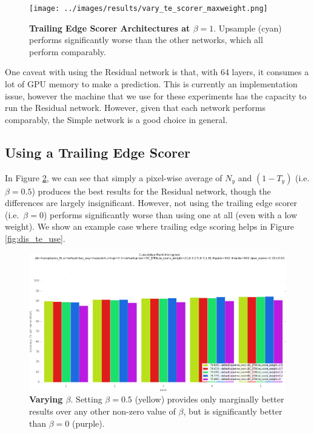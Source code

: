 \begin{figure}[t]%
\centering
\texttt{[image: ../images/results/vary\_te\_scorer\_maxweight.png]}
\caption{\textbf{Trailing Edge Scorer Architectures at $\beta = 1$}. Upsample (cyan) performs significantly worse than the other networks, which all perform comparably.}
\label{fig:vary_te_scorer_maxweight}
\end{figure}

One caveat with using the Residual network is that, with 64 layers, it consumes a lot of GPU memory to make a prediction.
This is currently an implementation issue, however the machine that we use for these experiments has the capacity to run the Residual network.
However, given that each network performs comparably, the Simple network is a good choice in general.

\subsection{Using a Trailing Edge Scorer}

In Figure \ref{fig:vary_te_weight}, we can see that simply a pixel-wise average of $N_y$ and $(1-T_y)$ (i.e. $\beta = 0.5$) produces the best results for the Residual network, though the differences are largely insignificant.
However, not using the trailing edge scorer (i.e.\ $\beta = 0$) performs significantly worse than using one at all (even with a low weight).
We show an example case where trailing edge scoring helps in Figure \ref{fig:dis_te_use}.

\begin{figure}[t]%
\centering
\includegraphics[width=1\textwidth]{../images/results/vary_te_weight.png}
\caption{\textbf{Varying $\beta$}. Setting $\beta = 0.5$ (yellow) provides only marginally better results over any other non-zero value of $\beta$, but is significantly better than $\beta = 0$ (purple).}
\label{fig:vary_te_weight}
\end{figure}


